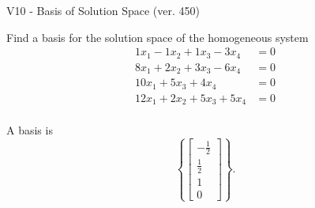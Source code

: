 \begin{exercise}
  \begin{exerciseTitle}V10 - Basis of Solution Space (ver. 450)\end{exerciseTitle}
  \begin{exerciseStatement}
    Find a basis for the solution space of the homogeneous system 
\begin{align*}
 1 x_ 1 -1 x_ 2 + 1 x_ 3 -3 x_ 4 &= 0  \\ 
  8 x_ 1 + 2 x_ 2 + 3 x_ 3 -6 x_ 4 &= 0  \\ 
  10 x_ 1 + 5 x_ 3 + 4 x_ 4 &= 0  \\ 
  12 x_ 1 + 2 x_ 2 + 5 x_ 3 + 5 x_ 4 &= 0  \\ 
 \end{align*}


 
  \end{exerciseStatement}

  \begin{exerciseAnswer}
   A basis is   
\[\left\{\left[\begin{array}{c}
-\frac{1}{2} \\
\frac{1}{2} \\
1 \\
0
\end{array}\right]\right\}.\]

  


  \end{exerciseAnswer}
\end{exercise}